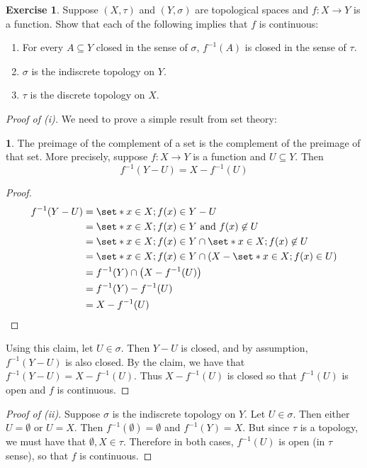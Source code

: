\documentclass[11pt]{article}
\numberwithin{equation}{section}
\newcounter{theo}[section]\setcounter{theo}{0}
\theoremstyle{definition}
\newtheorem{claim}{\color{ForestGreen}{\textbf{Claim}}}[section]
\theoremstyle{definition}
\newtheorem{exercise}{\color{YellowOrange}Exercise}[section]
\newcommand\parens[1]{\left( #1 \right)}
\newcommand\inv[1]{#1^{-1}}
\def\Set{\set*}%
\def\sse{\subseteq}
\newcommand{\1}{\mathbbm 1}
\def\t{\tau}
\begin{document}
\begin{exercise}
	Suppose $(X,\t)$ and $(Y,\sigma)$ are topological spaces and $f: X \to Y$ is a function. Show that each of the following implies that $f$ is continuous:
	\begin{enumerate}
		\item For every $A \sse Y$ closed in the sense of $\sigma$, $\inv{f}(A)$ is closed in the sense of $\t$.
		\item $\sigma$ is the indiscrete topology on $Y$.
		\item $\t$ is the discrete topology on $X$. 
	\end{enumerate}
\end{exercise}

\begin{proof}[Proof of (i)]
	We need to prove a simple result from set theory:
	\begin{claim}
		The preimage of the complement of a set is the complement of the preimage of that set. More precisely, suppose $f: X\to Y$ is a function and $U \sse Y$. Then 
		\begin{equation}
			\inv{f}(Y-U) = X - \inv{f}(U)
		\end{equation}
	\end{claim}
	\begin{proof}
		\begin{align*}
			\inv{f}(Y-U) &= \Set{x \in X; f(x) \in Y-U} \\
			&= \Set{x \in X; f(x) \in Y \text{ and } f(x) \not\in U} \\
			&= \Set{x \in X; f(x) \in Y} \cap \Set{x \in X; f(x) \not\in U} \\
			&= \Set{x \in X; f(x) \in Y} \cap \parens{X - \Set{x \in X; f(x) \in U}} \\
			&= \inv{f}(Y) \cap \parens{X - \inv{f}(U)} \\
			&= \inv{f}(Y) - \inv{f}(U) \\
			&= X - \inv{f}(U) 
		\end{align*}
	\end{proof}
	Using this claim, let $U \in \sigma$. Then $Y - U$ is closed, and by assumption, $\inv{f}(Y-U)$ is also closed. By the claim, we have that $\inv{f}(Y-U) = X - \inv{f}(U)$. Thus $X - \inv{f}(U)$ is closed so that $\inv{f}(U)$ is open and $f$ is continuous. 
\end{proof}

\begin{proof}[Proof of (ii)]
	Suppose $\sigma$ is the indiscrete topology on $Y$. Let $U \in \sigma$. Then either $U = \emptyset$ or $U = X$. Then $\inv{f}(\emptyset) = \emptyset$ and $\inv{f}(Y) = X$. But since $\t$ is a topology, we must have that $\emptyset, X \in \t$. Therefore in both cases, $\inv{f}(U)$ is open (in $\t$ sense), so that $f$ is continuous. 
\end{proof}
\end{document}
